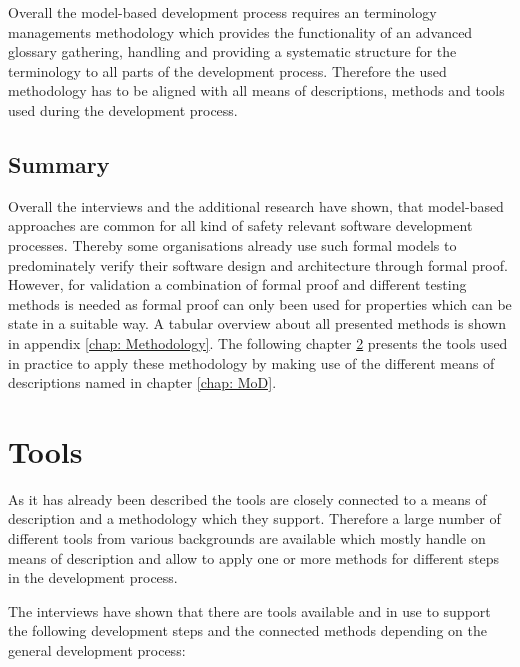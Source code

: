 \documentclass{./template/openetcs2}
\begin{document}
Overall the model-based development process requires an terminology managements methodology which provides the functionality of an advanced glossary gathering, handling and providing a systematic structure for the terminology to all parts of the development process. Therefore the used methodology has to be aligned with all means of descriptions, methods and tools used during the development process. 

\section{Summary}

Overall the interviews and the additional research have shown, that model-based approaches are common for all kind of safety relevant software development processes. Thereby some organisations already use such formal models to predominately verify their software design and architecture through formal proof. However, for validation a combination of formal proof and different testing methods is needed as formal proof can only been used for properties which can be state in a suitable way. A tabular overview about all presented methods is shown in appendix \ref{chap: Methodology}. The following chapter \ref{chap: tools} presents the tools used in practice to apply these methodology by making use of the different means of descriptions named in chapter \ref{chap: MoD}.


\chapter{Tools}

\label{chap: tools}

As it has already been described the tools are closely connected to a means of description  and a methodology which they support. Therefore a large number of different tools from various backgrounds are available which mostly handle on means of description and allow to apply one or more methods for different steps in the development process.

The interviews have shown that there are tools available and in use to support the following development steps and the connected methods depending on the general development process:
\end{document}
